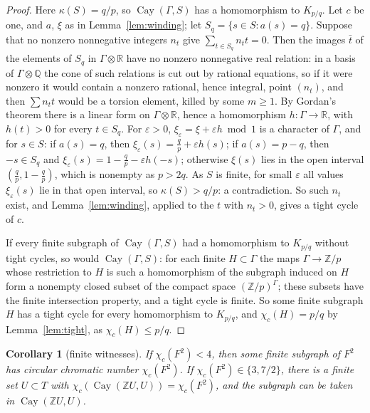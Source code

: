\documentclass[11pt,a4paper]{amsart}
\newtheorem{corollary}{Corollary}
\theoremstyle{remark}
\newcommand{\Q}{\mathbb{Q}}
\newcommand{\R}{\mathbb{R}}
\newcommand{\Z}{\mathbb{Z}}
\newcommand{\Cay}{\operatorname{Cay}}
\begin{document}
\begin{proof}
Here $\kappa(S)=q/p$, so $\Cay(\Gamma,S)$ has a homomorphism to $K_{p/q}$. Let $c$ be one, and $a$, $\xi$ as in
Lemma~\ref{lem:winding}; let $S_q=\{s\in S:a(s)=q\}$. Suppose that no nonzero nonnegative integers $n_t$ give
$\sum_{t\in S_q}n_tt=0$. Then the images $\bar t$ of the elements of $S_q$ in $\Gamma\otimes\R$ have no nonzero
nonnegative real relation: in a basis of $\Gamma\otimes\Q$ the cone of such relations is cut out by rational
equations, so if it were nonzero it would contain a nonzero rational, hence integral, point $(n_t)$, and then
$\sum n_tt$ would be a torsion element, killed by some $m\ge1$. By Gordan's theorem there is a linear form on
$\Gamma\otimes\R$, hence a homomorphism $h:\Gamma\to\R$, with $h(t)>0$ for every $t\in S_q$. For $\varepsilon>0$,
$\xi_\varepsilon=\xi+\varepsilon h\bmod1$ is a character of $\Gamma$, and for $s\in S$: if $a(s)=q$, then
$\xi_\varepsilon(s)=\frac qp+\varepsilon h(s)$; if $a(s)=p-q$, then $-s\in S_q$ and
$\xi_\varepsilon(s)=1-\frac qp-\varepsilon h(-s)$; otherwise $\xi(s)$ lies in the open interval
$(\frac qp,1-\frac qp)$, which is nonempty as $p>2q$. As $S$ is finite, for small $\varepsilon$ all values
$\xi_\varepsilon(s)$ lie in that open interval, so $\kappa(S)>q/p$: a contradiction. So such $n_t$ exist, and
Lemma~\ref{lem:winding}, applied to the $t$ with $n_t>0$, gives a tight cycle of $c$.

If every finite subgraph of $\Cay(\Gamma,S)$ had a homomorphism to $K_{p/q}$ without tight cycles, so would
$\Cay(\Gamma,S)$: for each finite $H\subset\Gamma$ the maps $\Gamma\to\Z/p$ whose restriction to $H$ is such a
homomorphism of the subgraph induced on $H$ form a nonempty closed subset of the compact space $(\Z/p)^\Gamma$;
these subsets have the finite intersection property, and a tight cycle is finite. So some finite subgraph $H$ has a
tight cycle for every homomorphism to $K_{p/q}$, and $\chi_c(H)=p/q$ by Lemma~\ref{lem:tight}, as
$\chi_c(H)\le p/q$.
\end{proof}

\begin{corollary}[finite witnesses]\label{cor:finite}
If $\chi_c(F^2)<4$, then some finite subgraph of $F^2$ has circular chromatic number $\chi_c(F^2)$. If
$\chi_c(F^2)\in\{3,7/2\}$, there is a finite set $U\subset T$ with $\chi_c(\Cay(\Z U,U))=\chi_c(F^2)$, and the
subgraph can be taken in $\Cay(\Z U,U)$.
\end{corollary}
\end{document}
